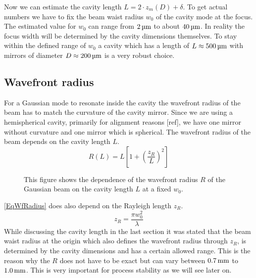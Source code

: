 Now we can estimate the cavity length $L=2\cdot z_{\si{m}}(D)+\delta$. To get actual numbers we have to fix the beam waist radius $w_0$ of the cavity mode at the focus. The estimated value for $w_0$ can range from $2\um$ to about $40\um$. In reality the focus width will be determined by the cavity dimensions themselves. To stay within the defined range of $w_0$ a cavity which has a length of $L\approx 500\um$ with mirrors of diameter $D\approx 200\um$ is a very robust choice.

\subsection{Wavefront radius}
For a Gaussian mode to resonate inside the cavity the wavefront radius of the beam has to match the curvature of the cavity mirror. Since we are using a hemispherical cavity, primarily for alignment reasons [ref], we have one mirror without curvature and one mirror which is spherical. The wavefront radius of the beam depends on the cavity length $L$.
\begin{equation}\label{EqWfRadius}
	R(L)=L\left[1+\left(\frac{z_{\si{R}}}{L}\right)^2\right]
\end{equation}
\begin{figure}[H]
	
	\caption{This figure shows the dependence of the wavefront radius $R$ of the Gaussian beam on the cavity length $L$ at a fixed $w_0$.}
\end{figure}
\autoref{EqWfRadius} does also depend on the Rayleigh length $z_{\si{R}}$.
\begin{equation}\label{EqRayleighRange}
	z_{\si{R}}=\frac{\pi w_0^2}{\lambda}
\end{equation}
While discussing the cavity length in the last section it was stated that the beam waist radius at the origin which also defines the wavefront radius through $z_{\si{R}}$, is determined by the cavity dimensions and has a certain allowed range. This is the reason why the $R$ does not have to be exact but can vary between $0.7\mm$ to $1.0\mm$. This is very important for process stability as we will see later on.

